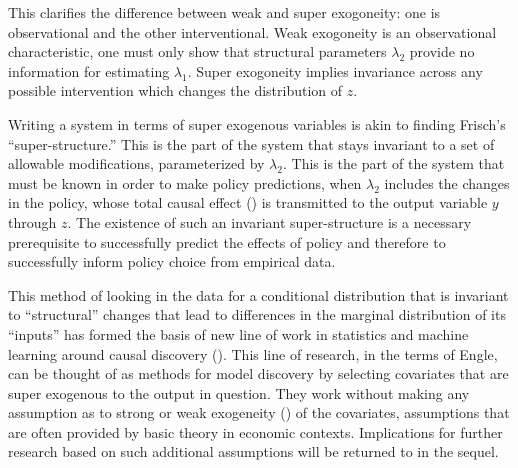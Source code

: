 \documentclass[a4paper,12pt]{article}
\begin{document}
This clarifies the difference between weak and super exogoneity: one is observational and the other interventional. Weak exogoneity is an observational characteristic, one must only show that structural parameters $\lambda_2$ provide no information for estimating $\lambda_1$. Super exogoneity implies invariance across any possible intervention which changes the distribution of $z$. 

Writing a system in terms of super exogenous variables is akin to finding Frisch's ``super-structure.'' This is the part of the system that stays invariant to a set of allowable modifications, parameterized by $\lambda_2$. This is the part of the system that must be known in order to make policy predictions, when $\lambda_2$ includes the changes in the policy, whose total causal effect (\cite[in the sense of][]{Pearl2000}) is transmitted to the output variable $y$ through $z$. The existence of such an invariant super-structure is a necessary prerequisite to successfully predict the effects of policy and therefore to successfully inform policy choice from empirical data.

This method of looking in the data for a conditional distribution that is invariant to ``structural'' changes that lead to differences in the marginal distribution of its ``inputs'' has formed the basis of new line of work in statistics and machine learning around causal discovery (\cite{Peters2015, Heinze-deml2017, Rojas-carulla2018}). This line of research, in the terms of Engle, can be thought of as methods for model discovery by selecting covariates that are super exogenous to the output in question. They work without making any assumption as to strong or weak exogeneity (\cite[in the sense of][]{Engle1983}) of the covariates, assumptions that are often provided by basic theory in economic contexts. Implications for further research based on such additional assumptions will be returned to in the sequel. 


\end{document}
